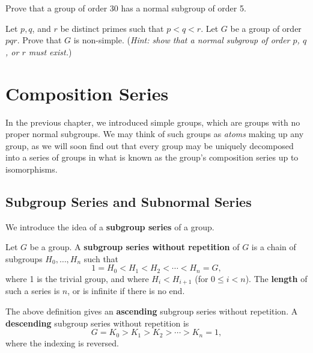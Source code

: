 \begin{problem}\label{problem-group-of-order-30-has-normal-subgroup-of-order-5}
    Prove that a group of order 30 has a normal subgroup of order 5.
\end{problem}

\begin{problem}\label{problem-group-of-order-pqr-is-non-simple}
    Let $p, q$, and $r$ be distinct primes such that $p < q < r$. Let $G$ be a group of order $pqr$. Prove that $G$ is non-simple.\newline
    (\textit{Hint: show that a normal subgroup of order $p$, $q$, or $r$ must exist.})
\end{problem}

\chapter{Composition Series}
In the previous chapter, we introduced simple groups, which are groups with no proper normal subgroups. We may think of such groups as \textit{atoms} making up any group, as we will soon find out that every group may be uniquely decomposed into a series of groups in what is known as the group's composition series up to isomorphisms.

\section{Subgroup Series and Subnormal Series}
We introduce the idea of a \textbf{subgroup series} of a group.
\begin{definition}
    Let $G$ be a group. A \textbf{subgroup series without repetition} of $G$ is a chain of subgroups $H_0, \dots, H_n$ such that
    \[
        1 = H_0 < H_1 < H_2 < \cdots < H_n = G,
    \]
    where 1 is the trivial group, and where $H_i < H_{i+1}$ (for $0 \leq i < n$). The \textbf{length} of such a series is $n$, or is infinite if there is no end.
\end{definition}
\begin{remark}
    The above definition gives an \textbf{ascending} subgroup series without repetition. A \textbf{descending} subgroup series without repetition is
    \[
        G = K_0 > K_1 > K_2 > \cdots > K_n = 1,
    \]
    where the indexing is reversed.
\end{remark}

